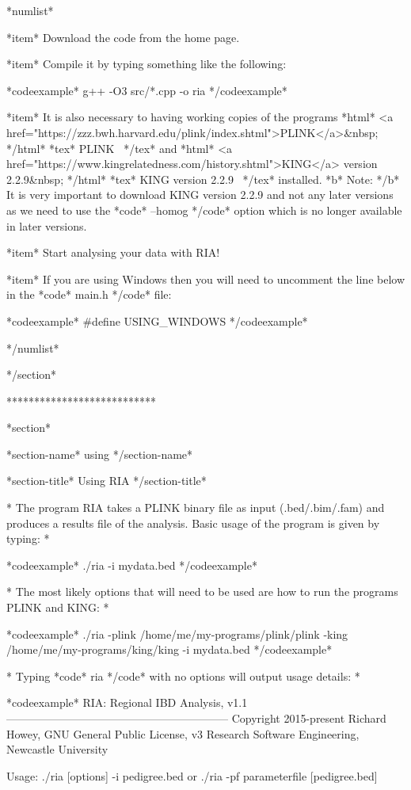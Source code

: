 *numlist*

*item* Download the code from the home page.

*item* Compile it by typing something like the following:

*codeexample*
g++ -O3 src/*.cpp -o ria
*/codeexample*

*item* It is also necessary to having working copies of the programs *html* <a href="https://zzz.bwh.harvard.edu/plink/index.shtml">PLINK</a>&nbsp; */html* *tex* PLINK~ */tex* and *html* <a href="https://www.kingrelatedness.com/history.shtml">KING</a> version 2.2.9&nbsp; */html* *tex* KING version 2.2.9~ */tex* installed. *b* Note: */b* It is very important to download KING version 2.2.9 and not any later versions as we need to use the *code* --homog */code* option which is no longer available in later versions.

*item* Start analysing your data with RIA!

*item* If you are using Windows then you will need to uncomment the line below in the *code* main.h */code* file:

*codeexample*
#define USING_WINDOWS
*/codeexample*

*/numlist*

*/section*

***************************

*section*

*section-name*
using
*/section-name*

*section-title*
Using RIA
*/section-title*

*
The program RIA takes a PLINK binary file as input (.bed/.bim/.fam) and produces a results file of the analysis. Basic usage of the program is given by typing:
*

*codeexample*
./ria -i mydata.bed
*/codeexample*

*
The most likely options that will need to be used are how to run the programs PLINK and KING:
*

*codeexample*
./ria -plink /home/me/my-programs/plink/plink -king /home/me/my-programs/king/king -i mydata.bed
*/codeexample*

*
Typing *code* ria */code* with no options will output usage details:
*

*codeexample*
RIA: Regional IBD Analysis, v1.1
------------------------------------------------------------
Copyright 2015-present Richard Howey, GNU General Public License, v3
Research Software Engineering, Newcastle University

Usage:
  ./ria [options] -i pedigree.bed
 or ./ria -pf parameterfile [pedigree.bed]

